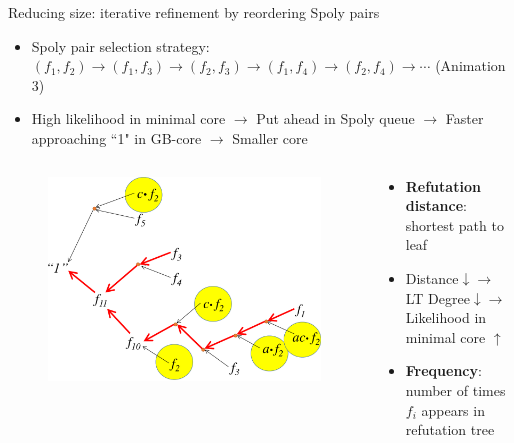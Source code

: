 \documentclass[xcolor=dvipsnames]{beamer}
\newcommand{\bi}{\begin{itemize}}
\newcommand{\ei}{\end{itemize}}
\begin{document}
\begin{frame}{\large{Reducing size: iterative refinement by reordering Spoly pairs}}
\bi
\item Spoly pair selection strategy: $(f_1,f_2)\to(f_1,f_3)\to(f_2,f_3)\to(f_1,f_4)\to(f_2,f_4)\to\cdots$  (Animation 3)
\item High likelihood in minimal core $\to$ Put ahead in Spoly queue $\to$ Faster approaching ``1" in GB-core $\to$ Smaller core
\ei
\vspace{-0.2in}
\begin{columns}[onlytextwidth]
\begin{column}{0.5\textwidth}
\begin{figure}
\centering
\includegraphics[scale=0.25]{refutation_2.pdf}
\end{figure}
\end{column}
\begin{column}{0.5\textwidth}
\bi
\item {\bf Refutation distance}: shortest path to leaf
\item Distance$\downarrow \to$ LT Degree$\downarrow \to$ Likelihood in minimal core $\uparrow$
\vspace{0.2in}
\item {\bf Frequency}: number of times $f_i$ appears in refutation tree
\ei
\end{column}
\end{columns}
\end{frame}

\end{document}
